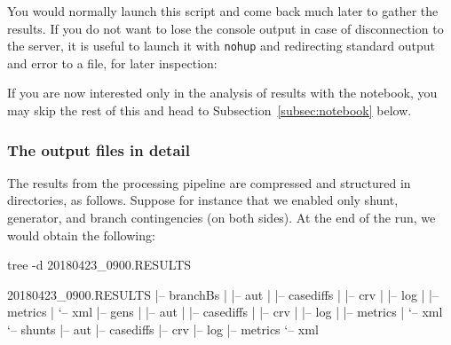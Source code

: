\documentclass[11pt, a4paper, twoside, titlepage]{article}
\newcommand{\code}[1]{\texttt{#1}}
\begin{document}
You would normally launch this script and come back much later to
gather the results. If you do not want to lose the console output in
case of disconnection to the server, it is useful to launch it with
\code{nohup} and redirecting standard output and error to a file, for
later inspection:

If you are now interested only in the analysis of results with the
notebook, you may skip the rest of this and head to
Subsection~\ref{subsec:notebook} below.



\subsubsection*{The output files in detail}

The results from the processing pipeline are compressed and structured
in directories, as follows.  Suppose for instance that we enabled only
shunt, generator, and branch contingencies (on both sides). At the end
of the run, we would obtain the following:
\begin{console}
  tree -d  20180423_0900.RESULTS
  
  20180423_0900.RESULTS
  |-- branchBs
  |   |-- aut
  |   |-- casediffs
  |   |-- crv
  |   |-- log
  |   |-- metrics
  |   `-- xml
  |-- gens
  |   |-- aut
  |   |-- casediffs
  |   |-- crv
  |   |-- log
  |   |-- metrics
  |   `-- xml
  `-- shunts
      |-- aut
      |-- casediffs
      |-- crv
      |-- log
      |-- metrics
      `-- xml
\end{console}
\end{document}

